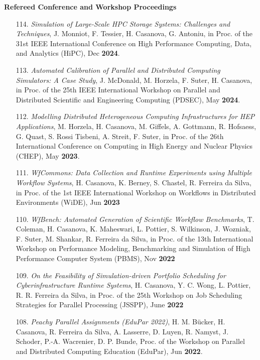 \noindent
{\bf Refereed Conference and Workshop Proceedings}

\begin{enumerate}

    \item [114.] {\it Simulation of Large-Scale HPC Storage Systems: Challenges and Techniques}, J. Monniot, F. Tessier, H. Casanova, G. Antoniu, in Proc. of the 31st IEEE International Conference on High Performance Computing, Data, and Analytics (HiPC), Dec {\bf 2024}.

    \item [113.] {\it Automated Calibration of Parallel and  Distributed Computing Simulators: A Case Study}, J. McDonald, M. Horzela, F. Suter, H. Casanova, in  Proc. of the 25th IEEE International Workshop on Parallel and Distributed Scientific and Engineering Computing (PDSEC), May {\bf 2024}.

    \item [112.] {\it Modelling Distributed Heterogeneous Computing Infrastructures for HEP Applications}, M. Horzela, H. Casanova, M. Giffels, A. Gottmann, R. Hofsaess, G. Quast, S. Rossi Tisbeni, A. Streit, F. Suter, in  Proc. of the 26th International Conference on Computing in High Energy and Nuclear Physics (CHEP), May {\bf 2023}.

    \item [111.] {\it WfCommons: Data Collection and Runtime Experiments using Multiple Workflow Systems}, H. Casanova, K. Berney, S. Chastel, R. Ferreira da Silva, in Proc. of the 1st IEEE International Workshop on Workflows in Distributed Environments (WiDE), Jun {\bf 2023}

    \item [110.] {\it WfBench: Automated Generation of Scientific Workflow Benchmarks}, T. Coleman, H. Casanova, K. Maheswari, L. Pottier, S. Wilkinson, J. Wozniak, F. Suter, M. Shankar, R. Ferreira da Silva, in Proc. of the 13th International Workshop on Performance Modeling, Benchmarking and Simulation of High Performance Computer System (PBMS), Nov {\bf 2022}


\item [109.] {\it On the Feasibility of Simulation-driven Portfolio Scheduling for Cyberinfrastructure Runtime Systems}, H. Casanova, Y. C. Wong, L. Pottier, R. R. Ferreira da Silva, in Proc. of the 25th Workshop on Job Scheduling Strategies for Parallel Processing (JSSPP), June {\bf 2022}

\item [108.] {\it Peachy Parallel Assignments (EduPar 2022)}, 
H. M. B\"ucker, H. Casanova, R. Ferreira da Silva, A. Lasserre, D. Luyen, R. Namyst, J. Schoder, P.-A. Wacrenier, D. P. Bunde, Proc. of the Workshop on Parallel and Distributed Computing Education (EduPar), Jun {\bf 2022}.


\end{enumerate}

